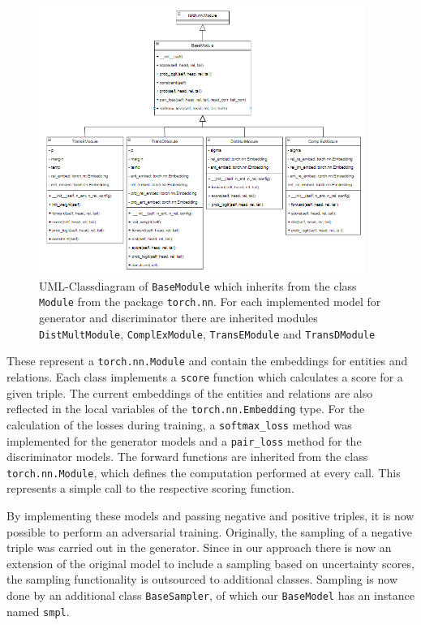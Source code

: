 \begin{figure}[t]
  \centering
    \includegraphics[width=0.95\textwidth]{figures/BaseModule.PNG}
  \caption{\ac{UML}-Classdiagram of \texttt{BaseModule} which inherits from the class \texttt{Module} from the package \texttt{torch.nn}.
  For each implemented model for generator and discriminator there are inherited modules \texttt{DistMultModule},  \texttt{ComplExModule},  \texttt{TransEModule} and  \texttt{TransDModule}}
  \label{fig:basemodule_classdiagram}
\end{figure}
These represent a \texttt{torch.nn.Module} and contain the embeddings for entities and relations.
Each class implements a \texttt{score} function which calculates a score for a given triple.
The current embeddings of the entities and relations are also reflected in the local variables of the \texttt{torch.nn.Embedding} type.
For the calculation of the losses during training, a \texttt{softmax\_loss} method was implemented for the generator models and a \texttt{pair\_loss} method for the discriminator models.
The forward functions are inherited from the class \texttt{torch.nn.Module}, which defines the computation performed at every call.
This represents a simple call to the respective scoring function.

By implementing these models and passing negative and positive triples, it is now possible to perform an adversarial training.
Originally, the sampling of a negative triple was carried out in the generator.
Since in our approach there is now an extension of the original model to include a sampling based on uncertainty scores, the sampling functionality is outsourced to additional classes.
Sampling is now done by an additional class \texttt{BaseSampler}, of which our \texttt{BaseModel} has an instance named \texttt{smpl}.